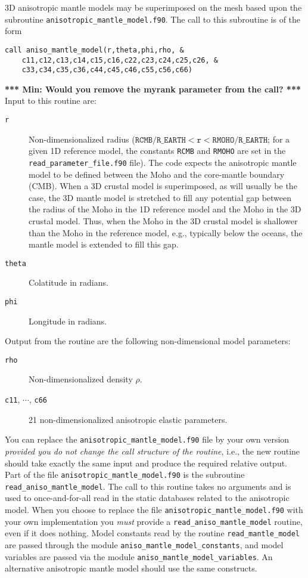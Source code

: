 \documentclass[onecolumn]{article}
\newcommand{\tomin}[1]{\textbf{*** Min: #1 ***}}
\begin{document}
3D anisotropic mantle models may be superimposed on the mesh based
upon the subroutine \texttt{anisotropic\_mantle\_model.f90}.
The call to this subroutine is of the form
\begin{verbatim}
call aniso_mantle_model(r,theta,phi,rho, &
    c11,c12,c13,c14,c15,c16,c22,c23,c24,c25,c26, &
    c33,c34,c35,c36,c44,c45,c46,c55,c56,c66)
\end{verbatim}
\tomin{Would you remove the myrank parameter from the call?}
Input to this routine are:
\begin{description}
\item[\texttt{r}] Non-dimensionalized radius
($\texttt{RCMB/R\_EARTH}<\texttt{r}<\texttt{RMOHO/R\_EARTH}$;
for a given 1D reference model,
the constants \texttt{RCMB} and \texttt{RMOHO} are set in the
\texttt{read\_parameter\_file.f90} file).
The code expects the anisotropic mantle model to be defined between the Moho
and the core-mantle boundary (CMB).
When a 3D crustal model is superimposed, as will usually
be the case, the 3D mantle model is stretched to fill any potential
gap between the radius of the Moho in the 1D reference model
and the Moho in the 3D crustal model.
Thus, when the Moho in the 3D crustal model is shallower than the Moho in
the reference model, e.g., typically below the oceans,
the mantle model is extended to fill this gap.
\item[\texttt{theta}] Colatitude in radians.
\item[\texttt{phi}] Longitude in radians.
\end{description}
Output from the routine are the following non-dimensional model parameters:
\begin{description}
\item[\texttt{rho}] Non-dimensionalized density $\rho$.
\item[\texttt{c11}, $\cdots$, \texttt{c66}] 21 non-dimensionalized
anisotropic elastic parameters.
\end{description}
You can replace the \texttt{anisotropic\_mantle\_model.f90} file by your own version
\textit{provided you do not change the call structure of the routine},
i.e., the new routine should take exactly the same input and
produce the required relative output.
Part of the file \texttt{anisotropic\_mantle\_model.f90} is the
subroutine \texttt{read\_aniso\_mantle\_model}.
The call to this routine takes no arguments and is used to once-and-for-all
read in the static databases related to the anisotropic model.
When you choose to replace
the file \texttt{anisotropic\_mantle\_model.f90} with your own implementation you
\textit{must} provide a \texttt{read\_aniso\_mantle\_model} routine,
even if it does nothing.
Model constants read by the routine \texttt{read\_mantle\_model}
are passed through
the module \texttt{aniso\_mantle\_model\_constants},
and model variables are passed via the module
\texttt{aniso\_mantle\_model\_variables}.
An alternative anisotropic mantle model should use the same constructs.
\end{document}
